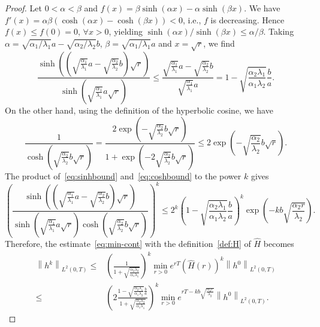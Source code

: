 \documentclass[reqno]{amsart}
\newcommand{\norm}[1]{\left\lVert#1\right\rVert}
\begin{document}
\begin{proof}
Let $0<\alpha<\beta$ and $f(x) = \beta\sinh(\alpha x) - \alpha \sinh(\beta x)$. We have $f'(x) = \alpha\beta(\cosh(\alpha x) - \cosh(\beta x)) < 0$, i.e., $f$ is decreasing. Hence $f(x) \leq f(0) = 0$, $\forall x>0$, yielding $\sinh(\alpha x) / \sinh(\beta x) \leq \alpha / \beta$. Taking $\alpha = \sqrt{\alpha_1/\lambda_1} a - \sqrt{\alpha_2/\lambda_2} b$, $\beta = \sqrt{\alpha_1/\lambda_1} a$ and $x = \sqrt{r}$, we find
\begin{equation}\label{eq:sinhbound}
\frac{\sinh\left((\sqrt{\frac{\alpha_1}{\lambda_1}} a - \sqrt{\frac{\alpha_2}{\lambda_2}} b) \sqrt{r} \right)}{\sinh\left(\sqrt{\frac{\alpha_1}{\lambda_1}} a \sqrt{r}\right)}\leq \frac{\sqrt{\frac{\alpha_1}{\lambda_1}} a - \sqrt{\frac{\alpha_2}{\lambda_2}} b}{\sqrt{\frac{\alpha_1}{\lambda_1}} a} = 1 - \sqrt{\frac{\alpha_2 \lambda_1}{\alpha_1\lambda_2}}\frac{b}{a}.
\end{equation}
On the other hand, using the definition of the hyperbolic cosine, we have
\begin{equation}\label{eq:coshbound}
\frac{1}{\cosh\left(\sqrt{\frac{\alpha_2}{\lambda_2}} b \sqrt{r} \right)} 
= \frac{2 \exp\left(-\sqrt{\frac{\alpha_2}{\lambda_2}} b \sqrt{r}\right)}{1 + \exp \left(-2\sqrt{\frac{\alpha_2}{\lambda_2}} b \sqrt{r} \right)} 
\leq 2 \exp\left(-\sqrt{\frac{\alpha_2}{\lambda_2}} b\sqrt{r}\right).
\end{equation}
The product of~\eqref{eq:sinhbound} and~\eqref{eq:coshbound} to the power $k$ gives
\begin{equation}\label{eq:BoundThm2}
\left(\frac{\sinh\left(\left(\sqrt{\frac{\alpha_1}{\lambda_1}} a - \sqrt{\frac{\alpha_2}{\lambda_2}} b\right) \sqrt{r} \right)}{\sinh\left(\sqrt{\frac{\alpha_1}{\lambda_1}} a \sqrt{r}\right)\cosh\left(\sqrt{\frac{\alpha_2}{\lambda_2}} b \sqrt{r}\right)}\right)^k
\leq 2^k\left(1 - \sqrt{\frac{\alpha_2 \lambda_1}{\alpha_1\lambda_2}}\frac{b}{a}\right)^k \exp\left(-kb\sqrt{\frac{\alpha_2r}{\lambda_2}}\right).
\end{equation}
Therefore, the estimate~\eqref{eq:min-cont} with the definition~\eqref{def:H} of $\hat H$ becomes
\begin{equation}\label{eq:minBoundThm2}
\begin{aligned}
\norm{h^k}_{L^2(0, T)} \leq& \left(\frac{1}{1+\sqrt{\frac{\alpha_2\lambda_2}{\alpha_1\lambda_1}}}\right)^k\min_{r>0}e^{rT} \left(\hat H(r)\right)^k \norm{h^0}_{L^2(0, T)}
\\
\leq& \left(2\frac{1 - \sqrt{\frac{\alpha_2 \lambda_1}{\alpha_1\lambda_2}}\frac{b}{a}}{1 + \sqrt{\frac{\alpha_2 \lambda_2}{\alpha_1\lambda_1}}} \right)^k \min_{r>0}e^{rT - kb\sqrt{\frac{\alpha_2r}{\lambda_2}}}\norm{h^0}_{L^2(0, T)}.
\end{aligned}
\end{equation}


\end{proof}
\end{document}
